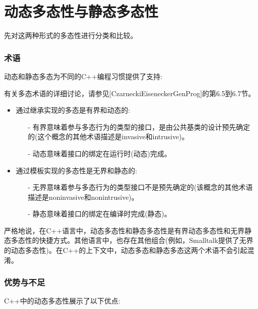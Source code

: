 \section{动态多态性与静态多态性}

先对这两种形式的多态性进行分类和比较。

\subsubsection{术语}

动态和静态多态为不同的C++编程习惯提供了支持:

\begin{notice}
有关多态术语的详细讨论，请参见[CzarneckiEiseneckerGenProg]的第6.5到6.7节。
\end{notice}

\begin{itemize}
\item 
通过继承实现的多态是有界和动态的:

\begin{itemize}
\item[-]
有界意味着参与多态行为的类型的接口，是由公共基类的设计预先确定的(这个概念的其他术语描述是invasive和intrusive)。

\item[-]
动态意味着接口的绑定在运行时(动态)完成。
\end{itemize}

\item 
通过模板实现的多态性是无界和静态的:

\begin{itemize}
\item[-]
无界意味着参与多态行为的类型接口不是预先确定的(该概念的其他术语描述是noninvasive和nonintrusive)。

\item[-]
静态意味着接口的绑定在编译时完成(静态)。
\end{itemize}
\end{itemize}

严格地说，在C++语言中，动态多态性和静态多态性是有界动态多态性和无界静态多态性的快捷方式。其他语言中，也存在其他组合(例如，Smalltalk提供了无界的动态多态性)。在C++的上下文中，动态多态和静态多态这两个术语不会引起混淆。

\subsubsection{优势与不足}

C++中的动态多态性展示了以下优点:


